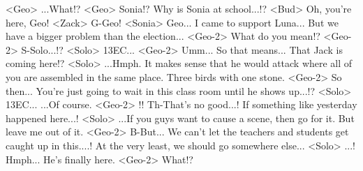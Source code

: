 <Geo> ...What!? 
<Geo> Sonia!? 
Why is Sonia at school...!? 
<Bud> Oh, you're here, Geo! 
<Zack> G-Geo! 
<Sonia> Geo... 
I came to support Luna... 
But we have a bigger problem than the election... 
<Geo-2> What do you mean!? 
<Geo-2> S-Solo...!? 
<Solo> {13}{EC}... 
<Geo-2> Umm... 
So that means... That Jack is coming here!? 
<Solo> ...Hmph. 
It makes sense that he would attack where all of 
you are assembled in the same place. 
Three birds with one stone. 
<Geo-2> So then... 
You're just going to wait in this class room until he shows up...!? 
<Solo> {13}{EC}... 
...Of course. 
<Geo-2> !! 
Th-That's no good...! 
If something like yesterday happened here...! 
<Solo> ...If you guys want to cause a scene, then go for it. 
But leave me out of it. 
<Geo-2> B-But... 
We can't let the teachers and students get caught up in this....! 
At the very least, we should go somewhere else... 
<Solo> ...! 
Hmph... He's finally here. 
<Geo-2> What!? 
